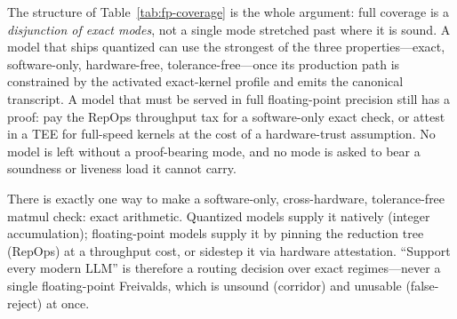 The structure of Table~\ref{tab:fp-coverage} is the whole argument: full coverage is a
\emph{disjunction of exact modes}, not a single mode stretched past where it is sound.
A model that ships quantized can use the strongest of the three properties---exact,
software-only, hardware-free, tolerance-free---once its production path is constrained by
the activated exact-kernel profile and emits the canonical transcript. A model that must be served in full floating-point precision still has
a proof: pay the RepOps throughput tax for a software-only exact check, or attest in a
TEE for full-speed kernels at the cost of a hardware-trust assumption. No model is left
without a proof-bearing mode, and no mode is asked to bear a soundness or liveness load
it cannot carry.

\begin{principle}
\label{prin:exactness-tiered}
There is exactly one way to make a software-only, cross-hardware, tolerance-free
matmul check: exact arithmetic. Quantized models supply it natively (integer
accumulation); floating-point models supply it by pinning the reduction tree (RepOps)
at a throughput cost, or sidestep it via hardware attestation. ``Support every modern
LLM'' is therefore a routing decision over exact regimes---never a single floating-point
Freivalds, which is unsound (corridor) and unusable (false-reject) at once.
\end{principle}
